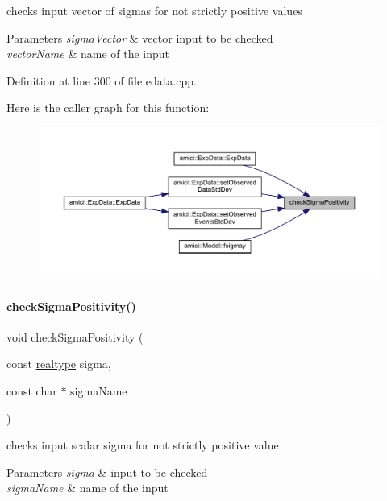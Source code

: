 checks input vector of sigmas for not strictly positive values


\begin{DoxyParams}{Parameters}
{\em sigma\+Vector} & vector input to be checked \\
\hline
{\em vector\+Name} & name of the input \\
\hline
\end{DoxyParams}


Definition at line 300 of file edata.\+cpp.

Here is the caller graph for this function\+:
\nopagebreak
\begin{figure}[H]
\begin{center}
\leavevmode
\includegraphics[width=350pt]{namespaceamici_adc4a77886dc856d69a483188a54331db_icgraph}
\end{center}
\end{figure}
\mbox{\label{namespaceamici_aaaf2890d0496acce04cdc1d00082dc8d}} 
\paragraph{\texorpdfstring{checkSigmaPositivity()}{checkSigmaPositivity()}\hspace{0.1cm}{\footnotesize\ttfamily [2/2]}}
{\footnotesize\ttfamily void check\+Sigma\+Positivity (\begin{DoxyParamCaption}\item[{const \mbox{\hyperlink{namespaceamici_a1bdce28051d6a53868f7ccbf5f2c14a3}{realtype}}}]{sigma,  }\item[{const char $\ast$}]{sigma\+Name }\end{DoxyParamCaption})}

checks input scalar sigma for not strictly positive value


\begin{DoxyParams}{Parameters}
{\em sigma} & input to be checked \\
\hline
{\em sigma\+Name} & name of the input \\
\hline
\end{DoxyParams}


